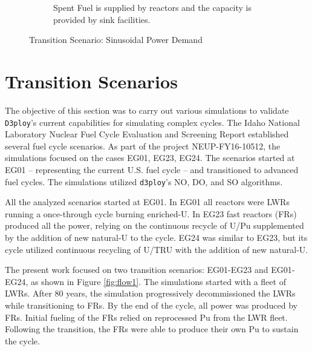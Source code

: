 \documentclass[11pt,letterpaper]{article}
\begin{document}
\begin{figure}[!htbp]
\begin{subfigure}[t]{0.65\textwidth}
        \caption{Spent Fuel is supplied by reactors and the capacity is provided by sink facilities.}
        \label{fig:sinetransition-spentfuel}
    \end{subfigure}
    \caption{Transition Scenario: Sinusoidal Power Demand}
\end{figure}

\pagebreak
\section{Transition Scenarios}

The objective of this section was to carry out various simulations to validate 
\texttt{D3ploy}'s current capabilities for simulating complex cycles.
The Idaho National Laboratory Nuclear Fuel Cycle Evaluation and Screening Report \cite{wigeland_nuclear_2014} established several fuel cycle scenarios.
As part of the project NEUP-FY16-10512, the simulations focused on the cases EG01, EG23, EG24. The scenarios started at EG01 -- representing the current U.S. fuel cycle -- and transitioned to advanced fuel cycles.
The simulations utilized \texttt{d3ploy}'s NO, DO, and SO algorithms.

All the analyzed scenarios started at EG01. In EG01 all reactors were LWRs running a  once-through cycle burning enriched-U.
In EG23 fast reactors (FRs) produced all the power, relying on the continuous recycle of U/Pu supplemented by the addition of new natural-U to the cycle.
EG24 was similar to EG23, but its cycle utilized continuous recycling of U/TRU with the addition of new natural-U.

The present work focused on two transition scenarios: EG01-EG23 and EG01-EG24,  as shown in Figure \ref{fig:flow1}. The simulations started with a fleet of LWRs. After 80 years, the simulation progressively decommissioned the LWRs while transitioning to FRs. By the end of the cycle, all power was produced by FRs. Initial fueling of the FRs relied on reprocessed Pu from the LWR fleet. Following the transition, the FRs were able to produce their own Pu to sustain the cycle.
\end{document}
